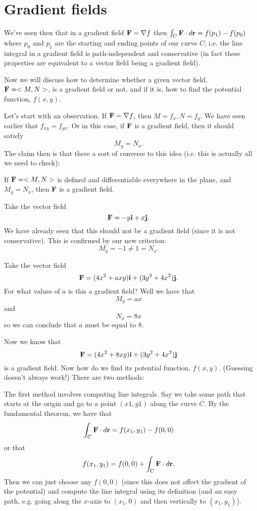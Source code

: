 \section{Gradient fields}

We've seen then that in a gradient field $\boldsymbol{\mathbf{F}} = \nabla f$ then $\int_C \boldsymbol{\mathbf{F}} \cdot d\boldsymbol{\mathbf{r}} = f(p_1) - f(p_0)$ where $p_0$ and $p_1$ are the starting and ending points of our curve $C$; i.e. the line integral in a gradient field is path-independent and conservative (in fact these properties are equivalent to a vector field being a gradient field).

Now we will discuss how to determine whether a given vector field, $\boldsymbol{\mathbf{F}} = <M,N>$, is a gradient field or not, and if it is, how to find the potential function, $f(x,y)$.

Let's start with an observation. If $\boldsymbol{\mathbf{F}} = \nabla f$, then $M=f_x,N=f_y$. We have seen earlier that $f_{xy}=f_{yx}$. Or in this case, if $\boldsymbol{\mathbf{F}}$ is a gradient field, then it should satisfy
\[ M_y = N_x. \] 
The claim then is that there a sort of converse to this idea (i.e. this is actually all we need to check):

\btm
If $\boldsymbol{\mathbf{F}} = <M,N>$ is defined and differentiable everywhere in the plane, and $M_y = N_x$, then $\boldsymbol{\mathbf{F}}$ is a gradient field.
\etm

\bex
Take the vector field
\[ \boldsymbol{\mathbf{F}} = -y\boldsymbol{\mathbf{i}} + x\boldsymbol{\mathbf{j}}. \]
We have already seen that this should not be a gradient field (since it is not conservative). This is confirmed by our new criterion:
\[ M_y = -1 \ne 1 = N_x. \]
\eex

\bex
Take the vector field
\[ \boldsymbol{\mathbf{F}} = (4x^2+axy)\boldsymbol{\mathbf{i}} + (3y^2 +4x^2)\boldsymbol{\mathbf{j}}. \]
For what values of $a$ is this a gradient field? Well we have that
\[ M_y = ax \]
and
\[ N_x = 8x \]
so we can conclude that $a$ must be equal to 8.

Now we know that
\[ \boldsymbol{\mathbf{F}} = (4x^2+8xy)\boldsymbol{\mathbf{i}} + (3y^2 +4x^2)\boldsymbol{\mathbf{j}} \]
is a gradient field. Now how do we find its potential function, $f(x,y)$. (Guessing doesn't always work!) There are two methods:
\ben 
\item The first method involves computing line integrals. Say we take some path that starts at the origin and go to a point $(x1,y1)$ along the curve $C$. By the fundamental theorem, we have that 
\[ \int_C \boldsymbol{\mathbf{F}} \cdot d\boldsymbol{\mathbf{r}} = f(x_1,y_1) - f(0,0) \]
or that
\[ f(x_1,y_1) = f(0,0) + \int_C \boldsymbol{\mathbf{F}} \cdot d\boldsymbol{\mathbf{r}} .\]
Then we can just choose any $f(0,0)$ (since this does not affect the gradient of the potential) and compute the line integral using its definition (and an easy path, e.g. going along the $x$-axis to $(x_1,0)$ and then vertically to $(x_1,y_1)$).

